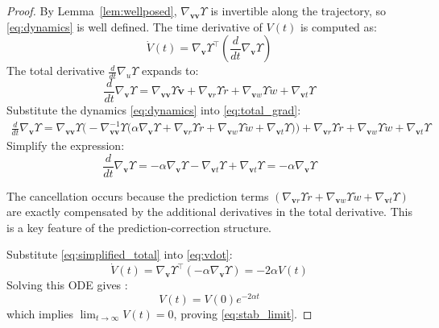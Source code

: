 \documentclass[fleqn,10pt]{wlscirep}
\begin{document}
\begin{proof}
By Lemma~\ref{lem:wellposed}, $\nabla_{\bm{vv}}\Upsilon$ is invertible along the trajectory, so \eqref{eq:dynamics} is well defined. The time derivative of $V(t)$ is computed as:
\begin{equation}
\dot{V}(t) = \nabla_{\bm{v}} \Upsilon^\top \left( \frac{d}{dt} \nabla_{\bm{v}} \Upsilon \right)
\label{eq:vdot}
\end{equation}
The total derivative $\frac{d}{dt}\nabla_u\Upsilon$ expands to:
\begin{equation}
\frac{d}{dt} \nabla_{\bm{v}} \Upsilon = \nabla_{\bm{v}\bm{v}} \Upsilon  \dot{\bm{v}} + \nabla_{\bm{v} r} \Upsilon \dot{r} + \nabla_{\bm{v} w} \Upsilon  \dot{w} + \nabla_{\bm{v} t} \Upsilon
\label{eq:total_grad}
\end{equation}
Substitute the dynamics \eqref{eq:dynamics} into \eqref{eq:total_grad}:
\begin{equation}
\begin{aligned}
\frac{d}{dt} \nabla_{\bm{v}} \Upsilon = \nabla_{\bm{v}\bm{v}} \Upsilon \bigg( -\nabla_{\bm{v}\bm{v}}^{-1} \Upsilon \big( \alpha \nabla_{\bm{v}} \Upsilon + \nabla_{\bm{v} r} \Upsilon \dot{r}+\nabla_{\bm{v} w} \Upsilon \dot{w}  + \nabla_{\bm{v} t} \Upsilon \big) \bigg) + \nabla_{\bm{v} r} \Upsilon \dot{r} + \nabla_{\bm{v} w} \Upsilon \dot{w} + \nabla_{\bm{v} t} \Upsilon
\end{aligned}
\end{equation}
Simplify the expression:
\begin{equation}
\frac{d}{dt} \nabla_{\bm{v}} \Upsilon = -\alpha \nabla_{\bm{v}} \Upsilon - \nabla_{\bm{v} t} \Upsilon + \nabla_{\bm{v} t} \Upsilon = -\alpha \nabla_{\bm{v}} \Upsilon
\label{eq:simplified_total}
\end{equation}

The cancellation occurs because the prediction terms $(\nabla_{\bm{v}r}\Upsilon\dot{r}+\nabla_{\bm{v}w}\Upsilon\dot{w}+\nabla_{\bm{v}t}\Upsilon)$ are exactly compensated by the additional derivatives in the total derivative. This is a key feature of the prediction-correction structure.

Substitute \eqref{eq:simplified_total} into \eqref{eq:vdot}:
\begin{equation}
\dot{V}(t) = \nabla_{\bm{v}} \Upsilon^\top \left( -\alpha \nabla_{\bm{v}} \Upsilon \right) = -2\alpha V(t)
\label{eq:vdot_ideal}
\end{equation}
Solving this ODE gives \cite{book12}:
\begin{equation}
V(t) = V(0) e^{-2\alpha t}
\label{eq:exp_decay}
\end{equation}
which implies $\lim_{t\to\infty}V(t)=0$, proving \eqref{eq:stab_limit}.
\end{proof}
\end{document}
